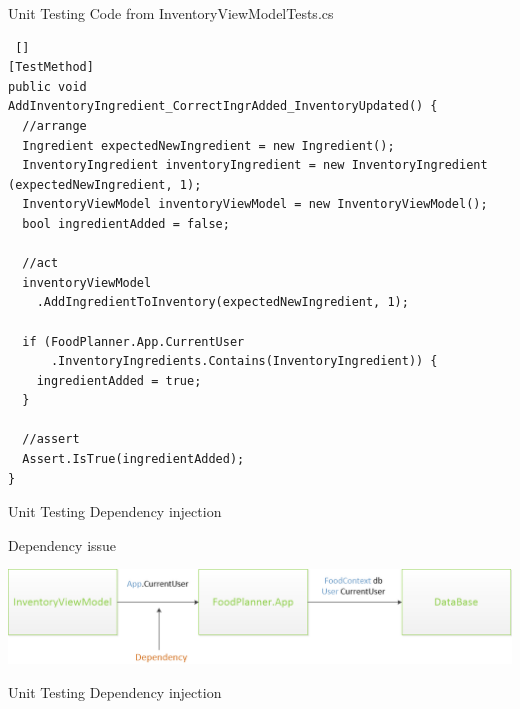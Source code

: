 \begin{frame} [fragile] {Unit Testing} {Code from InventoryViewModelTests.cs}

\begin{lstlisting} []
[TestMethod]
public void
AddInventoryIngredient_CorrectIngrAdded_InventoryUpdated() {
  //arrange
  Ingredient expectedNewIngredient = new Ingredient();
  InventoryIngredient inventoryIngredient = new InventoryIngredient (expectedNewIngredient, 1);
  InventoryViewModel inventoryViewModel = new InventoryViewModel();
  bool ingredientAdded = false;
  
  //act
  inventoryViewModel
    .AddIngredientToInventory(expectedNewIngredient, 1);
  
  if (FoodPlanner.App.CurrentUser
      .InventoryIngredients.Contains(InventoryIngredient)) {
    ingredientAdded = true;
  }
    
  //assert
  Assert.IsTrue(ingredientAdded);
}
\end{lstlisting}

\end{frame}

\begin{frame} {Unit Testing} {Dependency injection}

Dependency issue \newline

\includegraphics[width = \textwidth] {graphics/currentDependency.png}

\end{frame}

\begin{frame} {Unit Testing} {Dependency injection}

\end{frame}